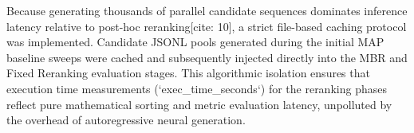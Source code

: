 Because generating thousands of parallel candidate sequences dominates inference latency relative to post-hoc reranking[cite: 10], a strict file-based caching protocol was implemented. Candidate JSONL pools generated during the initial MAP baseline sweeps were cached and subsequently injected directly into the MBR and Fixed Reranking evaluation stages. This algorithmic isolation ensures that execution time measurements (`exec_time_seconds`) for the reranking phases reflect pure mathematical sorting and metric evaluation latency, unpolluted by the overhead of autoregressive neural generation.
